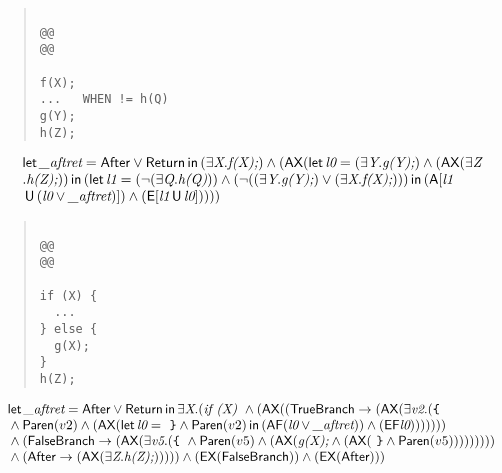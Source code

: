 \documentclass{article}
\newcommand{\U}{\,\mbox{\sf{U}}\,}
\newcommand{\A}{\mbox{\sf{A}}}
\newcommand{\E}{\mbox{\sf{E}}}
\newcommand{\AX}{\mbox{\sf{AX}}}
\newcommand{\EX}{\mbox{\sf{EX}}}
\newcommand{\AF}{\mbox{\sf{AF}}}
\newcommand{\EF}{\mbox{\sf{EF}}}
\newcommand{\mita}[1]{\mbox{\it{{#1}}}}
\newcommand{\msf}[1]{\mbox{\sf{{#1}}}}
\newcommand{\ttlb}{\mbox{\tt \char'173}}
\newcommand{\ttrb}{\mbox{\tt \char'175}}
\begin{document}
\begin{quote}\begin{verbatim}

@@
@@

f(X);
...   WHEN != h(Q)
g(Y);
h(Z);
\end{verbatim}\end{quote}

\[\begin{array}{l}
\mita{\sf{let}} \, \mita{\_aftret} = \msf{After} \vee \msf{Return} \, \mita{\sf{in}} \, (\exists \mita{X} . \mita{f(X);}) \wedge (\AX(\mita{\sf{let}} \, \mita{l0} = (\exists \mita{Y} . \mita{g(Y);}) \wedge (\AX(\exists \mita{Z}\\\mbox{} . \mita{h(Z);})) \, \mita{\sf{in}} \, (\mita{\sf{let}} \, \mita{l1} = (\neg (\exists \mita{Q} . \mita{h(Q)})) \wedge (\neg ((\exists \mita{Y} . \mita{g(Y);}) \vee (\exists \mita{X} . \mita{f(X);}))) \, \mita{\sf{in}} \, (\A[\mita{l1}\\\mbox{} \U (\mita{l0} \vee \mita{\_aftret})]
) \wedge (\E[\mita{l1} \U \mita{l0}]
)
)
))

\end{array}\]

\begin{quote}\begin{verbatim}

@@
@@

if (X) {
  ...
} else {
  g(X);
}
h(Z);
\end{verbatim}\end{quote}

\[\begin{array}{l}
\mita{\sf{let}} \, \mita{\_aftret} = \msf{After} \vee \msf{Return} \, \mita{\sf{in}} \, \exists \mita{X} . (\mita{if (X) } \wedge (\AX((\msf{TrueBranch} \rightarrow (\AX(\exists \mita{v2} . (\mita{{\ttlb}
  }\\\mbox{} \wedge \msf{Paren}(v2) \wedge (\AX(\mita{\sf{let}} \, \mita{l0} = \mita{
{\ttrb}} \wedge \msf{Paren}(v2) \, \mita{\sf{in}} \, (\AF(\mita{l0} \vee \mita{\_aftret})) \wedge (\EF\mita{l0})
))))))\\\mbox{} \wedge (\msf{FalseBranch} \rightarrow (\AX(\exists \mita{v5} . (\mita{{\ttlb}
  } \wedge \msf{Paren}(v5) \wedge (\AX(\mita{g(X);} \wedge (\AX(\mita{
{\ttrb}} \wedge \msf{Paren}(v5)))))))))\\\mbox{} \wedge (\msf{After} \rightarrow (\AX(\exists \mita{Z} . \mita{h(Z);}))))) \wedge (\EX(\msf{FalseBranch})) \wedge (\EX(\msf{After})))

\end{array}\]
\end{document}
